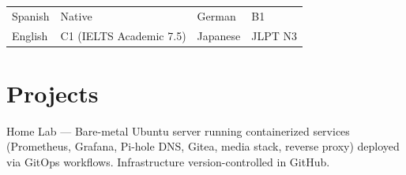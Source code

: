 \documentclass[a4paper,9pt]{extarticle}
\begin{document}
{\small
\begin{tabularx}{\textwidth}{@{}l X l X@{}}
  \mediumfont Spanish & Native & \mediumfont German & B1 \\
  \mediumfont English & C1 (IELTS Academic 7.5) & \mediumfont Japanese & JLPT N3 
\end{tabularx}
}


\section{Projects}

{\mediumfont Home Lab} --- Bare-metal Ubuntu server running containerized services (Prometheus, Grafana, Pi-hole DNS, Gitea, media stack, reverse proxy) deployed via GitOps workflows. Infrastructure version-controlled in GitHub.
\end{document}
